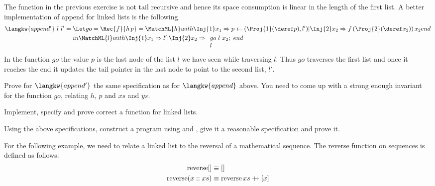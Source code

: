 \begin{exercise}
  The  function in the previous exercise
  is not tail recursive and hence its space consumption is
  linear in the length of the first list.
  A better implementation of append for linked lists is the following.
  \begin{align*}
    \langkw{append'}\ l\ l' ={} &\Let go = \Rec{f} {h\,p} =
    \MatchML{h}with{\Inj{1} x_1}=>{p \gets (\Proj{1}(\deref p), l')}|{\Inj{2} x_2}=>{f\, (\Proj{2}(\deref x_2))\, x_2}end{}\\
    &in \MatchML{l}with{\Inj{1} x_1}=>{l'}|{\Inj{2} x_2}=>{\begin{array}[t]{l}go\ l\ x_2 ;\\ l\end{array}}end{}
  \end{align*}
  In the function $go$ the value $p$ is the last node of the list $l$ we have seen while traversing $l$.
  Thus $go$ traverses the first list and once it reaches the end it updates the tail pointer in the last node to point to the second list, $l'$.

  Prove for $\langkw{append'}$ the same specification as for $\langkw{append}$ above.
  You need to come up with a strong enough invariant for the function $go$, relating $h$, $p$ and $xs$ and $ys$.
\end{exercise}

\begin{exercise}
  Implement, specify and prove correct a  function for linked lists.
\end{exercise}

\begin{exercise}
  Using the above specifications, construct a program using  and , give it a reasonable specification and prove it.
\end{exercise}

For the following example, we need to relate a linked list to the
reversal of a mathematical sequence. The reverse function on sequences
is defined as follows:
\begin{align*}
  \operatorname{reverse} [] &\equiv []\\
  \operatorname{reverse} (x::xs) &\equiv \operatorname{reverse} xs \mathbin{+\mkern-7mu+} [x]  
\end{align*}

